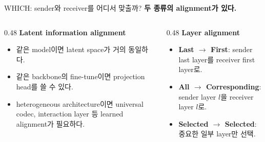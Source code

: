 \documentclass[
11pt,notheorems,hyperref={pdfauthor=whatever}
]{beamer}
\begin{document}
\begin{frame}[t]{WHICH: sender와 receiver를 어디서 맞출까?}
\small
\textbf{두 종류의 alignment가 있다.}

\vspace{0.35em}
\begin{columns}[T,onlytextwidth]
\begin{column}{0.48\textwidth}
\textbf{\textcolor{DeepBlue}{Latent information alignment}}
\begin{itemize}
  \item 같은 model이면 latent space가 거의 동일하다.
  \item 같은 backbone의 fine-tune이면 projection head를 쓸 수 있다.
  \item heterogeneous architecture이면 universal codec, interaction layer 등 learned alignment가 필요하다.
\end{itemize}
\end{column}
\begin{column}{0.48\textwidth}
\textbf{\textcolor{DeepBlue}{Layer alignment}}
\begin{itemize}
  \item \textbf{Last \(\rightarrow\) First}: sender last layer를 receiver first layer로.
  \item \textbf{All \(\rightarrow\) Corresponding}: sender layer \(l\)을 receiver layer \(l\)로.
  \item \textbf{Selected \(\rightarrow\) Selected}: 중요한 일부 layer만 선택.
\end{itemize}
\end{column}
\end{columns}

\vspace{0.45em}
\begin{center}
\end{center}
\end{frame}
\end{document}
